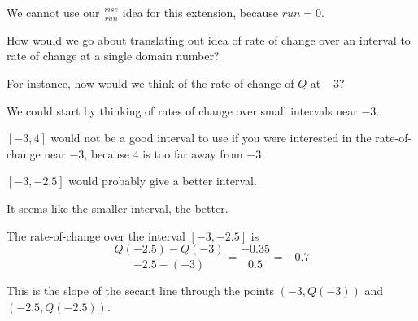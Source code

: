 \documentclass{ximera}
\begin{document}
We cannot use our $\frac{rise}{run}$ idea for this extension, because $run = 0$.

How would we go about translating out idea of rate of change over an interval to rate of change at a single domain number?


For instance, how would we think of the rate of change of $Q$ at $-3$?


We could start by thinking of rates of change over small intervals near $-3$.



$[-3, 4]$ would not be a good interval to use if you were interested in the rate-of-change near $-3$, because $4$ is too far away from $-3$.

$[-3, -2.5]$ would probably give a better interval. 

It seems like the smaller interval, the better.




The rate-of-change over the interval $[-3, -2.5]$ is 
\[  \frac{Q(-2.5)-Q(-3)}{-2.5-(-3)} = \frac{-0.35}{0.5} = -0.7      \]


This is the slope of the secant line through the points $(-3, Q(-3))$ and $(-2.5, Q(-2.5))$.











\begin{image}
\end{image}
\end{document}
